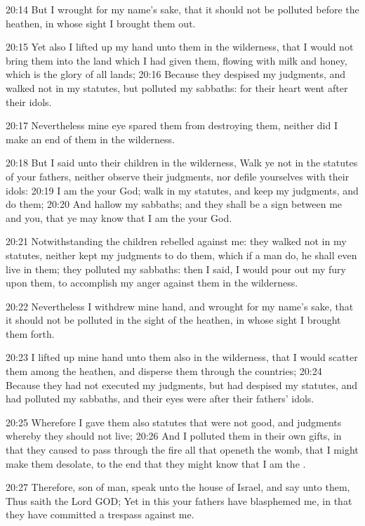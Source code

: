 20:14 But I wrought for my name's sake, that it should not be polluted before the heathen, in whose sight I brought them out.

20:15 Yet also I lifted up my hand unto them in the wilderness, that I would not bring them into the land which I had given them, flowing with milk and honey, which is the glory of all lands; 20:16 Because they despised my judgments, and walked not in my statutes, but polluted my sabbaths: for their heart went after their idols.

20:17 Nevertheless mine eye spared them from destroying them, neither did I make an end of them in the wilderness.

20:18 But I said unto their children in the wilderness, Walk ye not in the statutes of your fathers, neither observe their judgments, nor defile yourselves with their idols: 20:19 I am the \LORD your God; walk in my statutes, and keep my judgments, and do them; 20:20 And hallow my sabbaths; and they shall be a sign between me and you, that ye may know that I am the \LORD your God.

20:21 Notwithstanding the children rebelled against me: they walked not in my statutes, neither kept my judgments to do them, which if a man do, he shall even live in them; they polluted my sabbaths: then I said, I would pour out my fury upon them, to accomplish my anger against them in the wilderness.

20:22 Nevertheless I withdrew mine hand, and wrought for my name's sake, that it should not be polluted in the sight of the heathen, in whose sight I brought them forth.

20:23 I lifted up mine hand unto them also in the wilderness, that I would scatter them among the heathen, and disperse them through the countries; 20:24 Because they had not executed my judgments, but had despised my statutes, and had polluted my sabbaths, and their eyes were after their fathers' idols.

20:25 Wherefore I gave them also statutes that were not good, and judgments whereby they should not live; 20:26 And I polluted them in their own gifts, in that they caused to pass through the fire all that openeth the womb, that I might make them desolate, to the end that they might know that I am the \LORD.

20:27 Therefore, son of man, speak unto the house of Israel, and say unto them, Thus saith the Lord GOD; Yet in this your fathers have blasphemed me, in that they have committed a trespass against me.

